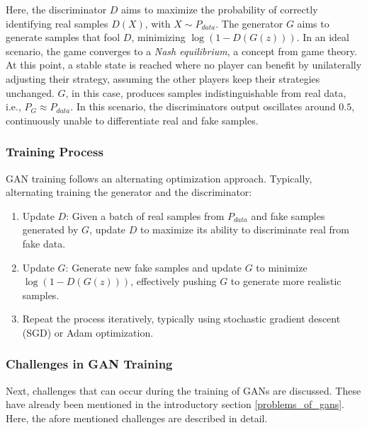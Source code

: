 Here, the discriminator \(D\) aims to maximize the probability of correctly identifying real samples \(D(X)\), with \(X \sim P_{data}\). The generator \(G\) aims to generate samples that fool \(D\), minimizing \(\log(1 - D(G(z)))\). In an ideal scenario, the game converges to a \textit{Nash equilibrium}, a concept from game theory. At this point, a stable state is reached where no player can benefit by unilaterally adjusting their strategy, assuming the other players keep their strategies unchanged. \(G\), in this case, produces samples indistinguishable from real data, i.e., \(P_G \approx P_{data}\). In this scenario, the discriminators output oscillates around $0.5$, continuously unable to differentiate real and fake samples.

\subsubsection{Training Process}\label{theoretical_gan_training}
GAN training follows an alternating optimization approach. Typically, alternating training the generator and the discriminator:
\begin{enumerate}
    \item Update \(D\): Given a batch of real samples from \(P_{data}\) and fake samples generated by \(G\), update \(D\) to maximize its ability to discriminate real from fake data.
    \item Update \(G\): Generate new fake samples and update \(G\) to minimize \\ \(\log(1 - D(G(z)))\), effectively pushing \(G\) to generate more realistic samples.
    \item Repeat the process iteratively, typically using stochastic gradient descent (SGD) or Adam optimization.
\end{enumerate}

\subsubsection{Challenges in GAN Training}\label{theory_gan_problems}
Next, challenges that can occur during the training of GANs are discussed. These have already been mentioned in the introductory section \ref{problems_of_gans}. Here, the afore mentioned challenges are described in detail.

